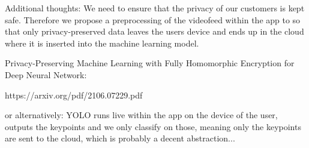 


Additional thoughts:
We need to ensure that the privacy of our customers is kept safe. Therefore we propose a preprocessing of the videofeed within the app to so that only privacy-preserved data leaves the users device and ends up in the cloud where it is inserted into the machine learning model.

Privacy-Preserving Machine Learning with Fully Homomorphic Encryption for Deep Neural Network:

https://arxiv.org/pdf/2106.07229.pdf


or alternatively:
YOLO runs live within the app on the device of the user, outputs the keypoints and we only classify on those, meaning only the keypoints are sent to the cloud, which is probably a decent abstraction...
